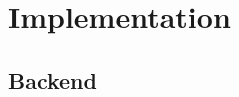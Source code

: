 \documentclass[ucs,10pt]{beamer}
\begin{document}
\section{Implementation}

\subsection{Backend}

\end{document}
